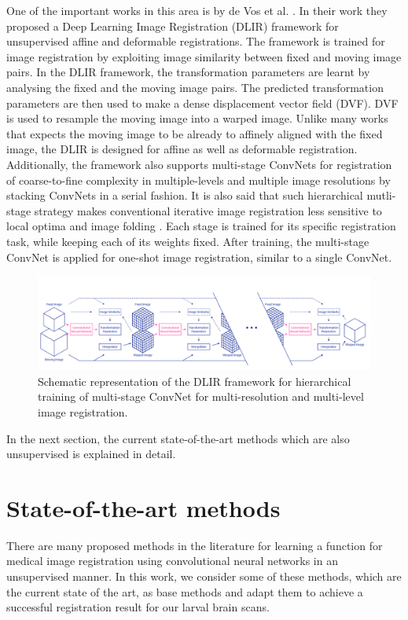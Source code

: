 \documentclass{report}
\begin{document}
	One of the important works in this area is by de Vos et al. \cite{de_Vos_2019}. In their work they proposed a Deep Learning Image Registration (DLIR) framework for unsupervised affine and deformable registrations. The framework is trained for image registration by exploiting image similarity between fixed and moving image pairs. In the DLIR framework, the transformation parameters are learnt by analysing the fixed and the moving image pairs. The predicted transformation parameters are then used to make a dense displacement vector field (DVF). DVF is used to resample the moving image into a warped image. Unlike many works that expects the moving image to be already to affinely aligned with the fixed image, the DLIR is designed for affine as well as deformable registration. Additionally, the framework also supports multi-stage ConvNets for registration of coarse-to-fine complexity in multiple-levels and multiple image resolutions by stacking ConvNets in a serial fashion. It is also said that such hierarchical mutli-stage strategy makes conventional iterative image registration less sensitive to local optima and image folding \cite{10.1007/3-540-45468-3_69}. Each stage is trained for its specific registration task, while keeping each of its weights fixed. After training, the multi-stage ConvNet is applied for one-shot image registration, similar to a single ConvNet.
	
	\begin{figure}
		\centering
		\includegraphics[width=\columnwidth]{resources/chapter2/DLIR.png}
		\caption{Schematic representation of the DLIR framework for hierarchical training of multi-stage ConvNet for multi-resolution and multi-level image registration. \cite{de_Vos_2019}}
		\label{fig:DLIR}
	\end{figure}
	
	In the next section, the current state-of-the-art methods which are also unsupervised is explained in detail.
	
	\section{State-of-the-art methods}
	There are many proposed methods in the literature for learning a function for medical image registration using convolutional neural networks in an unsupervised manner. In this work, we consider some of these methods, which are the current state of the art, as base methods and adapt them to achieve a successful registration result for our larval brain scans.
	
\end{document}
